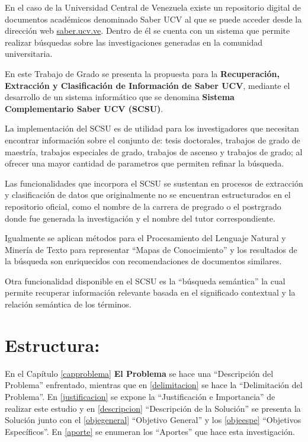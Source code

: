 \documentclass[
  12pt,
  openany]{book}
\begin{document}
En el caso de la Universidad Central de Venezuela existe un repositorio digital de documentos académicos denominado Saber UCV al que se puede acceder desde la dirección web \href{http://saber.ucv.ve/}{saber.ucv.ve}. Dentro de él se cuenta con un sistema que permite realizar búsquedas sobre las investigaciones generadas en la comunidad universitaria.

En este Trabajo de Grado se presenta la propuesta para la \textbf{Recuperación, Extracción y Clasificación de Información de Saber UCV}, mediante el desarrollo de un sistema informático que se denomina \textbf{Sistema Complementario Saber UCV (SCSU)}.

La implementación del SCSU es de utilidad para los investigadores que necesitan encontrar información sobre el conjunto de: tesis doctorales, trabajos de grado de maestría, trabajos especiales de grado, trabajos de ascenso y trabajos de grado; al ofrecer una mayor cantidad de parametros que permiten refinar la búsqueda.

Las funcionalidades que incorpora el SCSU se sustentan en procesos de extracción y clasificación de datos que originalmente no se encuentran estructurados en el repositorio oficial, como el nombre de la carrera de pregrado o el postrgrado donde fue generada la investigación y el nombre del tutor correspondiente.

Igualmente se aplican métodos para el Procesamiento del Lenguaje Natural y Minería de Texto para representar ``Mapas de Conocimiento'' \citep{dueñas2011} y los resultados de la búsqueda son enriquecidos con recomendaciones de documentos similares.

Otra funcionalidad disponible en el SCSU es la ``búsqueda semántica'' la cual permite recuperar información relevante basada en el significado contextual y la relación semántica de los términos.

\hypertarget{estructura}{%
\section{Estructura:}\label{estructura}}

En el Capítulo \ref{capproblema} \textbf{El Problema} se hace una ``Descripción del Problema'' enfrentado, mientras que en \ref{delimitacion} se hace la ``Delimitación del Problema''. En \ref{justificacion} se expone la ``Justificación e Importancia'' de realizar este estudio y en \ref{descripcion} ``Descripción de la Solución'' se presenta la Solución junto con el \ref{objegeneral} ``Objetivo General'' y los \ref{objeespe} ``Objetivos Específicos''. En \ref{aporte} se enumeran los ``Aportes'' que hace esta investigación.
\end{document}
